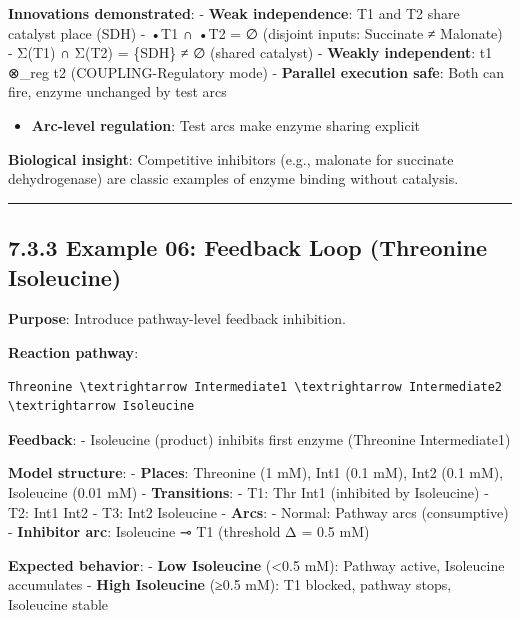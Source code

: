 \textbf{Innovations demonstrated}: - \checkmark \textbf{Weak independence}: T1
and T2 share catalyst place (SDH) - •T1 ∩ •T2 = ∅ (disjoint inputs:
Succinate ≠ Malonate) - Σ(T1) ∩ Σ(T2) = \{SDH\} ≠ ∅ (shared catalyst) -
\textbf{Weakly independent}: t1 ⊗\_reg t2 (COUPLING-Regulatory mode) -
\textbf{Parallel execution safe}: Both can fire, enzyme unchanged by
test arcs

\begin{itemize}
\tightlist
\item
  \checkmark \textbf{Arc-level regulation}: Test arcs make enzyme sharing
  explicit
\end{itemize}

\textbf{Biological insight}: Competitive inhibitors (e.g., malonate for
succinate dehydrogenase) are classic examples of enzyme binding without
catalysis.

\begin{center}\rule{0.5\linewidth}{0.5pt}\end{center}

\hypertarget{example-06-feedback-loop-threonine-isoleucine}{%
\subsection{7.3.3 Example 06: Feedback Loop (Threonine \textrightarrow
Isoleucine)}\label{example-06-feedback-loop-threonine-isoleucine}}

\textbf{Purpose}: Introduce pathway-level feedback inhibition.

\textbf{Reaction pathway}:

\begin{lstlisting}
Threonine \textrightarrow Intermediate1 \textrightarrow Intermediate2 \textrightarrow Isoleucine
\end{lstlisting}

\textbf{Feedback}: - Isoleucine (product) inhibits first enzyme
(Threonine \textrightarrow Intermediate1)

\textbf{Model structure}: - \textbf{Places}: Threonine (1 mM), Int1 (0.1
mM), Int2 (0.1 mM), Isoleucine (0.01 mM) - \textbf{Transitions}: - T1:
Thr \textrightarrow Int1 (inhibited by Isoleucine) - T2: Int1 \textrightarrow Int2 - T3: Int2 \textrightarrow
Isoleucine - \textbf{Arcs}: - Normal: Pathway arcs (consumptive) -
\textbf{Inhibitor arc}: Isoleucine ⊸ T1 (threshold Δ = 0.5 mM)

\textbf{Expected behavior}: - \textbf{Low Isoleucine} (\textless0.5 mM):
Pathway active, Isoleucine accumulates - \textbf{High Isoleucine} (≥0.5
mM): T1 blocked, pathway stops, Isoleucine stable

